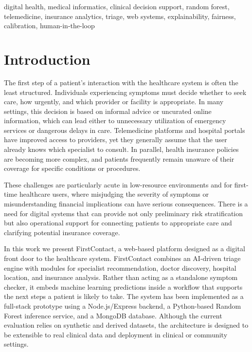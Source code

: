 \documentclass[conference]{IEEEtran}
\begin{document}
\begin{IEEEkeywords}
digital health, medical informatics, clinical decision support, random forest, telemedicine, insurance analytics, triage, web systems, explainability, fairness, calibration, human-in-the-loop
\end{IEEEkeywords}

\section{Introduction}

The first step of a patient's interaction with the healthcare system is often the least structured. Individuals experiencing symptoms must decide whether to seek care, how urgently, and which provider or facility is appropriate. In many settings, this decision is based on informal advice or uncurated online information, which can lead either to unnecessary utilization of emergency services or dangerous delays in care. Telemedicine platforms and hospital portals have improved access to providers, yet they generally assume that the user already knows which specialist to consult. In parallel, health insurance policies are becoming more complex, and patients frequently remain unaware of their coverage for specific conditions or procedures.

These challenges are particularly acute in low-resource environments and for first-time healthcare users, where misjudging the severity of symptoms or misunderstanding financial implications can have serious consequences. There is a need for digital systems that can provide not only preliminary risk stratification but also operational support for connecting patients to appropriate care and clarifying potential insurance coverage.

In this work we present FirstContact, a web-based platform designed as a digital front door to the healthcare system. FirstContact combines an AI-driven triage engine with modules for specialist recommendation, doctor discovery, hospital location, and insurance analysis. Rather than acting as a standalone symptom checker, it embeds machine learning predictions inside a workflow that supports the next steps a patient is likely to take. The system has been implemented as a full-stack prototype using a Node.js/Express backend, a Python-based Random Forest inference service, and a MongoDB database. Although the current evaluation relies on synthetic and derived datasets, the architecture is designed to be extensible to real clinical data and deployment in clinical or community settings.
\end{document}
